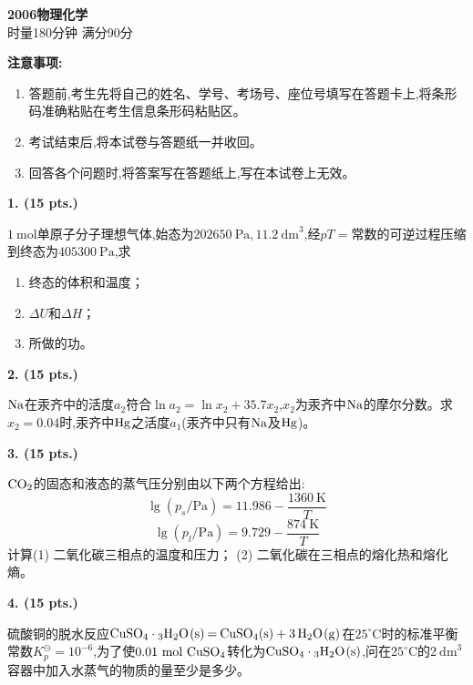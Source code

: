 \begin{center}
    {\LARGE \textbf{2006物理化学}} \\[2ex]
    {\large 时量180分钟 \quad 满分90分}
\end{center}

\vspace{0.5cm}
\noindent\textbf{注意事项:}
\begin{enumerate}[label=\arabic*., parsep=0pt, itemsep=0pt]
    \item 答题前,考生先将自己的姓名、学号、考场号、座位号填写在答题卡上,将条形码准确粘贴在考生信息条形码粘贴区。
    \item 考试结束后,将本试卷与答题纸一并收回。
    \item 回答各个问题时,将答案写在答题纸上,写在本试卷上无效。
\end{enumerate}

\vspace{0.5cm}
\noindent\textbf{1. (15 pts.)}

$1\ \mathrm{mol}$单原子分子理想气体,始态为$202650\ \mathrm{Pa},11.2\ \mathrm{dm}^3$,经$pT=$常数的可逆过程压缩到终态为$405300\ \mathrm{Pa}$,求
\begin{enumerate}[label=(\arabic*), itemsep=1ex]
    \item 终态的体积和温度；
    \item $\Delta U$和$\Delta H$；
    \item 所做的功。
\end{enumerate}

\vspace{0.5cm}
\noindent\textbf{2. (15 pts.)}

$\ce{Na}$在汞齐中的活度$a_2$符合$\ln a_2 = \ln x_2 + 35.7x_2$,$x_2$为汞齐中$\ce{Na}$的摩尔分数。求$x_2=0.04$时,汞齐中$\ce{Hg}$之活度$a_1$(汞齐中只有$\ce{Na}$及$\ce{Hg}$)。

\vspace{0.5cm}
\noindent\textbf{3. (15 pts.)}

$\ce{CO_{2}}$的固态和液态的蒸气压分别由以下两个方程给出:
\[
\lg(p_s/\mathrm{Pa}) = 11.986 - \frac{1360\ \mathrm{K}}{T}
\]
\[
\lg(p_l/\mathrm{Pa}) = 9.729 - \frac{874\ \mathrm{K}}{T}
\]
计算(1) 二氧化碳三相点的温度和压力；
(2) 二氧化碳在三相点的熔化热和熔化熵。

\vspace{0.5cm}
\noindent\textbf{4. (15 pts.)}

硫酸铜的脱水反应$\ce{CuSO_{4}\cdot 3H_{2}O(s) = CuSO_{4}(s) + 3H_{2}O(g)}$在$25^\circ\mathrm{C}$时的标准平衡常数$K_p^\ominus = 10^{-6}$,为了使$0.01\ \mathrm{mol}\ \ce{CuSO_{4}}$转化为$\ce{CuSO_{4}\cdot 3H_{2}O(s)}$,问在$25^\circ\mathrm{C}$的$2\ \mathrm{dm}^3$容器中加入水蒸气的物质的量至少是多少。

